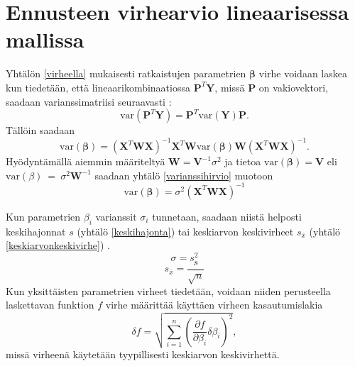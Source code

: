 \documentclass[12pt,a4paper,titlepage]{article}
\newcommand{\matr}[1]{\bm{#1}}
\newcommand{\transpose}[1]{{#1}^T}
\newcommand{\var}{\text{var}}
\begin{document}
\section{Ennusteen virhearvio lineaarisessa mallissa} \label{linvirhe}
Yhtälön \ref{virheella} mukaisesti ratkaistujen parametrien $\matr{\beta}$ virhe voidaan laskea kun tiedetään, että lineaarikombinaatiossa $\transpose{\matr{P}}\matr{Y}$, missä $\matr{P}$ on vakiovektori, saadaan varianssimatriisi seuraavasti \cite{statisticsforphysicists}:
\begin{equation*}
	\text{var}(\transpose{\matr{P}}\matr{Y}) = \transpose{\matr{P}}\text{var}(\matr{Y})\matr{P}.
\end{equation*}
Tällöin saadaan
\begin{equation} \label{varianssihirvio}
	\var(\matr{\beta}) =  (\transpose{\matr{X}}\matr{W}\matr{X})^{-1}\transpose{\matr{X}}\matr{W}\var(\matr{\beta}) \matr{W}(\transpose{\matr{X}}\matr{W}\matr{X})^{-1}.
\end{equation}
Hyödyntämällä aiemmin määriteltyä $\matr{W}=\matr{V}^{-1}\sigma^2$ ja tietoa $\var(\matr{\beta})=\matr{V}$ eli $\var(\beta)~=~\sigma^2\matr{W}^{-1}$ saadaan yhtälö \ref{varianssihirvio} muotoon
\begin{equation}
	\var(\matr{\beta}) = \sigma^2(\transpose{\matr{X}}\matr{W}\matr{X})^{-1}	
\end{equation}

Kun parametrien $\beta_i$ varianssit $\sigma_i$ tunnetaan, saadaan niistä helposti keskihajonnat $s$ (yhtälö \ref{keskihajonta}) tai keskiarvon keskivirheet $s_{\bar{x}}$ (yhtälö \ref{keskiarvonkeskivirhe}) \cite{maol}.
\begin{equation} \label{keskihajonta}
	\sigma=s^2
\end{equation}
\begin{equation} \label{keskiarvonkeskivirhe}
	s_{\bar{x}} = \frac{s}{\sqrt{n}}
\end{equation}
Kun yksittäisten parametrien virheet tiedetään, voidaan niiden perusteella laskettavan funktion $f$ virhe määrittää käyttäen virheen kasautumislakia \cite{error}
\begin{equation}
	\delta f = \sqrt{\sum\limits_{i=1}^n\left(\frac{\partial f}{\partial\beta_i}\delta\beta_i\right)^2},
\end{equation}
missä virheenä käytetään tyypillisesti keskiarvon keskivirhettä.
\end{document}
